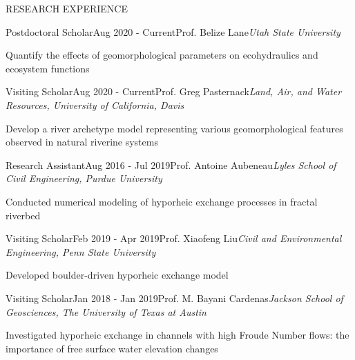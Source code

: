 \documentclass{resume_anzy} %
\begin{document}

\begin{rSection}{RESEARCH EXPERIENCE }


\begin{rSubsection}{Postdoctoral Scholar}{Aug 2020 - Current}{Prof. Belize Lane}{\textit{Utah State University}}
\item  Quantify the effects of geomorphological parameters on ecohydraulics and ecosystem functions
\end{rSubsection}

\vspace{-2.5mm}
\begin{rSubsection}{Visiting Scholar}{Aug 2020 - Current}{Prof. Greg Pasternack}{\textit{Land, Air, and Water Resources, University of California, Davis}}
\item  Develop a river archetype model representing various geomorphological features observed in natural riverine systems
\end{rSubsection}

\vspace{-2.5mm}
\begin{rSubsection}{Research Assistant}{Aug 2016 - Jul 2019}{Prof. Antoine Aubeneau}{\textit{Lyles School of Civil Engineering, Purdue University}}
\item Conducted numerical modeling of hyporheic exchange processes in fractal riverbed
\end{rSubsection}


\vspace{-2.5mm}
\begin{rSubsection}{Visiting Scholar}{Feb 2019 - Apr 2019}{Prof. Xiaofeng Liu}{\textit{Civil and Environmental Engineering, Penn State University}}
\item Developed boulder-driven hyporheic exchange model
\end{rSubsection}

\vspace{-2.5mm}
\begin{rSubsection}{Visiting Scholar}{Jan 2018 - Jan 2019}{Prof. M. Bayani Cardenas}{\textit{Jackson School of Geosciences, The University of Texas at Austin}}
\item  Investigated hyporheic exchange in channels with high Froude Number flows: the importance of free surface water elevation changes
\end{rSubsection}


\end{rSection}
\end{document}

